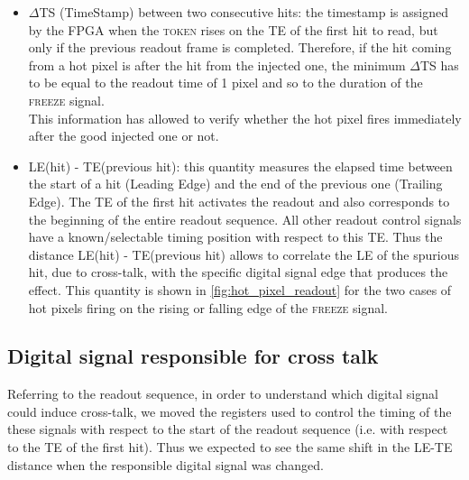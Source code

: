 \begin{itemize}
\item $\Delta$TS (TimeStamp) between two consecutive hits: the timestamp is assigned by the FPGA when the \textsc{token} rises on the TE of the first hit to read, but only if the previous readout frame is completed. Therefore, if the hit coming from a hot pixel is after the hit from the injected one, the minimum $\Delta$TS has to be equal to the readout time of 1 pixel and so to the duration of the \textsc{freeze} signal.\\
This information has allowed to verify whether the hot pixel fires immediately after the good injected one or not.
\item LE(hit) - TE(previous hit): this quantity measures the elapsed time between the start of a hit (Leading Edge) and the end of the previous one (Trailing Edge). The TE of the first hit  activates the readout and also corresponds to the beginning of the entire readout sequence. All other readout control signals have a known/selectable timing position with respect to this TE. Thus the distance LE(hit) - TE(previous hit) allows to correlate the LE of the spurious hit, due to cross-talk, with the specific digital signal edge that produces the effect. 
This quantity is shown in \autoref{fig:hot_pixel_readout}
for the two cases of hot pixels firing on the rising or falling edge of the \textsc{freeze} signal.
\end{itemize}



\subsection{Digital signal responsible for cross talk }

Referring to the readout sequence, in order to understand which digital signal could induce cross-talk, we moved the registers used to control the timing of the these signals with respect to the start of the readout sequence (i.e. with respect to the TE of the first hit). Thus we expected to see the same shift in the LE-TE distance when the responsible digital signal was changed.

